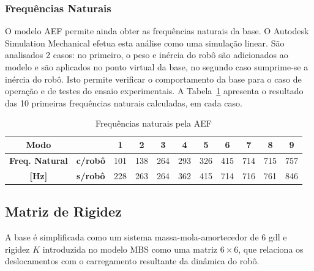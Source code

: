 \subsubsection{Frequências Naturais}

O modelo AEF permite ainda obter as frequências naturais da base. O Autodesk
Simulation Mechanical efetua esta análise como uma simulação linear. São
analisados 2 casos: no primeiro, o peso e inércia do robô são adicionados ao
modelo e são aplicados no ponto virtual da base, no segundo caso sumprime-se a
inércia do robô. Isto permite verificar o comportamento da base para o caso de
operação e de testes do ensaio experimentais. A
Tabela~\ref{tab::freq_naturais_teste} apresenta o resultado das 10 primeiras
frequências naturais calculadas, em cada caso.

\begin{table}[h]
\centering
\caption{Frequências naturais pela AEF}
\label{tab::freq_naturais_teste}
\begin{tabular}{ccccccccccc}
\hline
\textbf{Modo}          & \textbf{}       & 1   & 2   & 3   & 4   & 5   & 6   & 7   & 8   & 9   \\ \hline
\textbf{Freq. Natural} & \textbf{c/robô} & 101 & 138 & 264 & 293 & 326 & 415 & 714 & 715 & 757 \\
\textbf{{[}Hz{]}}      & \textbf{s/robô} & 228 & 263 & 264 & 362 & 415 & 714 & 716 & 761 & 846 \\ \hline
\end{tabular}
\end{table}



\subsection{Matriz de Rigidez}

A base é simplificada como um sistema massa-mola-amortecedor de
6 gdl e rigidez $K$ introduzida no modelo MBS como uma matriz $6 \times 6$, que
relaciona os deslocamentos com o carregamento resultante da dinâmica do robô.

